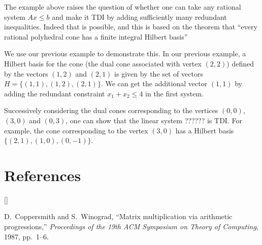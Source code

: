 \documentclass{article}
\def\beginrefs{\begin{list}%
        {[\arabic{equation}]}{\usecounter{equation}
         \setlength{\leftmargin}{2.0truecm}\setlength{\labelsep}{0.4truecm}%
         \setlength{\labelwidth}{1.6truecm}}}
\def\endrefs{\end{list}}
\def\bibentry#1{\item[\hbox{[#1]}]}
\begin{document}
The example above raises the question of whether one can take any rational system $Ax\leq b$ and make it TDI by adding sufficiently many redundant inequalities. Indeed that is possible, and this is based on the theorem that ``every rational polyhedral cone has a finite integral Hilbert basis''

We use our previous example to demonstrate this. In our previous example, a Hilbert basis for the cone (the dual cone associated with vertex $(2,2)$) defined by the vectors $(1,2)$ and $(2,1)$ is given by the set of vectors $H=\{(1,1),(1,2),(2,1)\}$. We can get the additional vector $(1,1)$ by adding the redundant constraint $x_1+x_2\leq 4$ in the first system.

Successively considering the dual cones corresponding to the vertices $(0,0)$, $(3,0)$ and $(0,3)$, one can show that the linear system ?????? is TDI. For example, the cone corresponding to the vertex $(3,0)$ has a Hilbert basis $\{(2,1),(1,0),(0,-1)\}$.

\section*{References}
\beginrefs
\bibentry{CW87}{\sc D.~Coppersmith} and {\sc S.~Winograd},
``Matrix multiplication via arithmetic progressions,''
{\it Proceedings of the 19th ACM Symposium on Theory of Computing},
1987, pp.~1--6.
\endrefs

\end{document}
